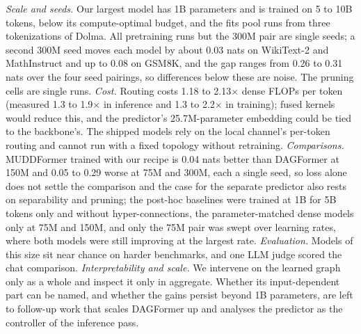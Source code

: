 \documentclass[11pt]{article}
\newcommand{\dagf}{DAGFormer}
\begin{document}
\emph{Scale and seeds.} Our largest model has 1B parameters and is trained on 5 to 10B tokens, below its compute-optimal budget, and the fits pool runs from three tokenizations of Dolma. All pretraining runs but the 300M pair are single seeds; a second 300M seed moves each model by about 0.03 nats on WikiText-2 and MathInstruct and up to 0.08 on GSM8K, and the gap ranges from 0.26 to 0.31 nats over the four seed pairings, so differences below these are noise. The pruning cells are single runs. \emph{Cost.} Routing costs 1.18 to 2.13$\times$ dense FLOPs per token (measured 1.3 to 1.9$\times$ in inference and 1.3 to 2.2$\times$ in training); fused kernels would reduce this, and the predictor's 25.7M-parameter embedding could be tied to the backbone's. The shipped models rely on the local channel's per-token routing and cannot run with a fixed topology without retraining. \emph{Comparisons.} MUDDFormer trained with our recipe is 0.04 nats better than \dagf{} at 150M and 0.05 to 0.29 worse at 75M and 300M, each a single seed, so loss alone does not settle the comparison and the case for the separate predictor also rests on separability and pruning; the post-hoc baselines were trained at 1B for 5B tokens only and without hyper-connections, the parameter-matched dense models only at 75M and 150M, and only the 75M pair was swept over learning rates, where both models were still improving at the largest rate. \emph{Evaluation.} Models of this size sit near chance on harder benchmarks, and one LLM judge scored the chat comparison. \emph{Interpretability and scale.} We intervene on the learned graph only as a whole and inspect it only in aggregate. Whether its input-dependent part can be named, and whether the gains persist beyond 1B parameters, are left to follow-up work that scales \dagf{} up and analyses the predictor as the controller of the inference pass.



\appendix
\end{document}
